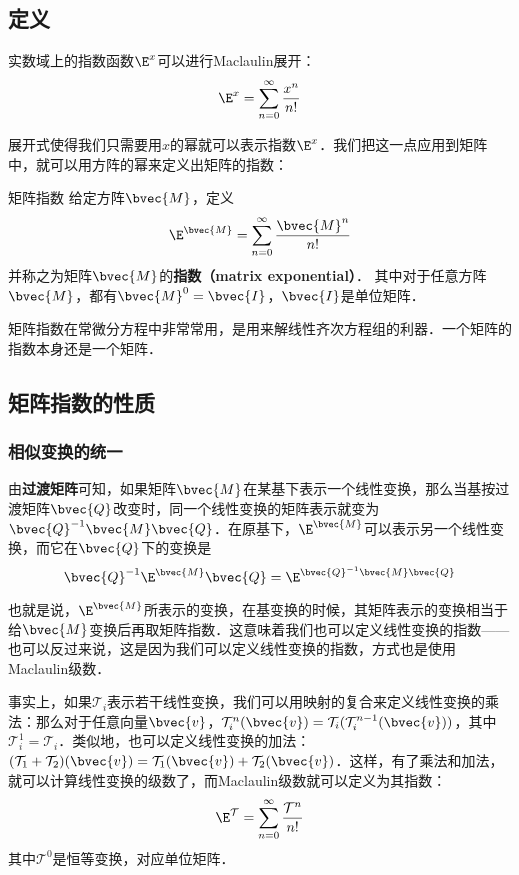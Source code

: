 

\subsection{定义}
实数域上的指数函数$\E^x$可以进行Maclaulin展开：\begin{equation}
\E^x=\sum\limits_{n=0}^\infty \frac{x^n}{n!}
\end{equation}

展开式使得我们只需要用$x$的幂就可以表示指数$\E^x$．我们把这一点应用到矩阵中，就可以用方阵的幂来定义出矩阵的指数：

\begin{definition}{矩阵指数}
给定方阵$\bvec{M}$，定义
\begin{equation}
\E^{\bvec{M}}=\sum_{n=0}^\infty \frac{\bvec{M}^n}{n!}
\end{equation}
并称之为矩阵$\bvec{M}$的\textbf{指数（matrix exponential）}． 其中对于任意方阵$\bvec{M}$，都有$\bvec{M}^0=\bvec{I}$，$\bvec{I}$是单位矩阵．
\end{definition}

矩阵指数在常微分方程中非常常用，是用来解线性齐次方程组的利器．一个矩阵的指数本身还是一个矩阵．

\subsection{矩阵指数的性质}

\subsubsection{相似变换的统一}

由\textbf{过渡矩阵}可知，如果矩阵$\bvec{M}$在某基下表示一个线性变换，那么当基按过渡矩阵$\bvec{Q}$改变时，同一个线性变换的矩阵表示就变为$\bvec{Q}^{-1}\bvec{M}\bvec{Q}$．在原基下，$\E^{\bvec{M}}$可以表示另一个线性变换，而它在$\bvec{Q}$下的变换是
\begin{equation}\label{MatExp_eq1}
\bvec{Q}^{-1}\E^{\bvec{M}}\bvec{Q}=\E^{\bvec{Q}^{-1}\bvec{M}\bvec{Q}}
\end{equation}

也就是说，$\E^{\bvec{M}}$所表示的变换，在基变换的时候，其矩阵表示的变换相当于给$\bvec{M}$变换后再取矩阵指数．这意味着我们也可以定义线性变换的指数——也可以反过来说，这是因为我们可以定义线性变换的指数，方式也是使用Maclaulin级数．

事实上，如果$\mathcal{T}_i$表示若干线性变换，我们可以用映射的复合来定义线性变换的乘法：那么对于任意向量$\bvec{v}$，$\mathcal{T}^n_i(\bvec{v})=\mathcal{T}_i(\mathcal{T}^{n-1}_i(\bvec{v}))$，其中$\mathcal{T}_i^1=\mathcal{T}_i$．类似地，也可以定义线性变换的加法：$(\mathcal{T}_1+\mathcal{T}_2)(\bvec{v})=\mathcal{T}_1(\bvec{v})+\mathcal{T}_2(\bvec{v})$．这样，有了乘法和加法，就可以计算线性变换的级数了，而Maclaulin级数就可以定义为其指数：
\begin{equation}
\E^\mathcal{T}=\sum\limits_{n=0}^\infty \frac{\mathcal{T}^n}{n!}
\end{equation}
其中$\mathcal{T}^0$是恒等变换，对应单位矩阵．


